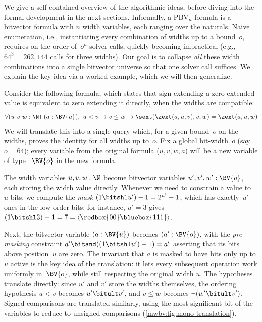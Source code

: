 We give a self-contained overview of the algorithmic ideas, before diving into
the formal development in the next sections.
%
Informally, a $\text{PBV}_n$ formula is a bitvector formula with $n$ width
variables, each ranging over the naturals. Naive enumeration, i.e.,
instantiating every combination of widths up to a bound~$o$, requires on the
order of~$o^n$ solver calls, quickly becoming impractical (e.g., $64^3 =
262{,}144$ calls for three widths). Our goal is to collapse \emph{all} these
width combinations into a single bitvector universe so that one solver call
suffices. We explain the key idea via a worked example, which we will then
generalize.

Consider the following formula, which states that sign extending a
zero extended value is equivalent to zero extending it directly, when
the widths are compatible:
\[
\forall (u~v~w : \N)~(a : \BV{u}),~
u < v \to v \leq w \to
\sext(\zext(a, u, v), v, w) = \zext(a, u, w)
\]
We will translate this into a single \qfbv{} query which, for a given bound~$o$
on the widths, proves the identity for all widths up to~$o$.
%
Fix a global bit-width~$o$ (say $o = 64$); every variable from the original
formula ($u, v, w, a$) will be a new variable of type ~$\BV{o}$ in the new
formula.

The width variables $u, v, w : \N$ become bitvector variables
$u', v', w' : \BV{o}$, each storing the width value directly.
Whenever we need to constrain a value to~$u$ bits, we compute the
\emph{mask} $(1 \bitshl u') - 1 = 2^{u'} - 1$, which has exactly~$u'$
ones in the low-order bits: for instance, $u' = 3$ gives
$(1 \bitshl 3) - 1 = 7 = \langle\redbox{00}\bluebox{111}\rangle$.

Next, the bitvector variable $(a : \BV{u})$ becomes $(a' : \BV{o})$, with the
\emph{pre-masking} constraint $a' \bitand ((1 \bitshl u') - 1) = a'$ asserting
that its bits above position~$u$ are zero.
The invariant that $a$ is masked to have bits only up to $u$ active is
the key idea of the translation: it lets every subsequent operation work
uniformly in~$\BV{o}$, while still respecting the original width $u$.
%
The hypotheses translate directly: since $u'$ and $v'$ store the widths
themselves, the ordering hypothesis $u < v$ becomes $u' \bitult v'$,
and $v \leq w$ becomes $\neg(w' \bitult v')$. Signed comparisons are translated similarly,
using the most significant bit of the variables to reduce to unsigned comparisons (\cref{mwbv:fig:mono-translation}).

